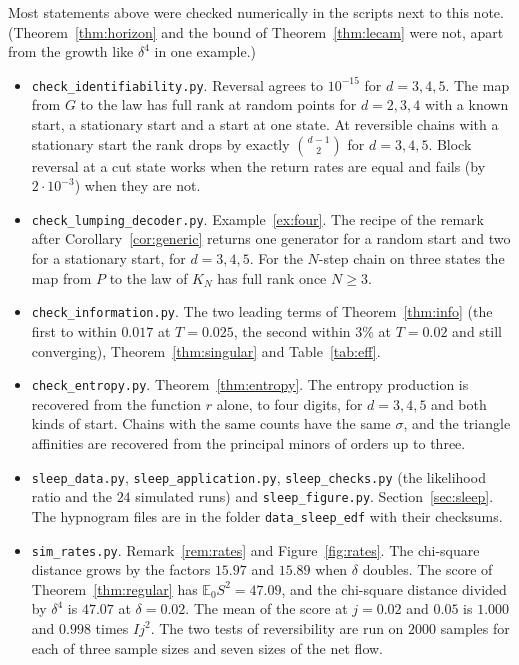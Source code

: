 \documentclass[11pt]{article}
\theoremstyle{definition}
\theoremstyle{remark}
\newcommand{\E}{\mathbb E}
\begin{document}
Most statements above were checked numerically in the scripts next to this note. (Theorem~\ref{thm:horizon} and the bound of Theorem~\ref{thm:lecam} were not, apart from the growth like $\delta^4$ in one example.)
\begin{itemize}[itemsep=1pt]
\item \texttt{check\_identifiability.py}. Reversal agrees to $10^{-15}$ for
 $d=3,4,5$. The map from $G$ to the law has full rank at random points for
 $d=2,3,4$ with a known start, a stationary start and a start at one state. At
 reversible chains with a stationary start the rank drops by exactly
 $\binom{d-1}2$ for $d=3,4,5$. Block reversal at a cut state works when the
 return rates are equal and fails (by $2\cdot10^{-3}$) when they are not.
\item \texttt{check\_lumping\_decoder.py}. Example~\ref{ex:four}. The recipe of
 the remark after Corollary~\ref{cor:generic} returns one generator for a random
 start and two for a stationary start, for $d=3,4,5$. For the $N$-step chain on
 three states the map from $P$ to the law of $K_N$ has full rank once $N\ge3$.
\item \texttt{check\_information.py}. The two leading terms of
 Theorem~\ref{thm:info} (the first to within $0.017$ at $T=0.025$, the second
 within $3\%$ at $T=0.02$ and still converging), Theorem~\ref{thm:singular} and
 Table~\ref{tab:eff}.
\item \texttt{check\_entropy.py}. Theorem~\ref{thm:entropy}. The entropy
 production is recovered from the function $r$ alone, to four digits, for
 $d=3,4,5$ and both kinds of start. Chains with the same counts have the same
 $\sigma$, and the triangle affinities are recovered from the principal minors
 of orders up to three.
\item \texttt{sleep\_data.py}, \texttt{sleep\_application.py},
 \texttt{sleep\_checks.py} (the likelihood ratio and the $24$ simulated runs) and
 \texttt{sleep\_figure.py}. Section~\ref{sec:sleep}. The hypnogram files are in
 the folder \texttt{data\_sleep\_edf} with their checksums.
\item \texttt{sim\_rates.py}. Remark~\ref{rem:rates} and Figure~\ref{fig:rates}.
 The chi-square distance grows by the factors $15.97$ and $15.89$ when
 $\delta$ doubles. The score of Theorem~\ref{thm:regular} has $\E_0S^2=47.09$,
 and the chi-square distance divided by $\delta^4$ is $47.07$ at
 $\delta=0.02$. The mean of the score at $j=0.02$ and $0.05$ is $1.000$ and
 $0.998$ times $Ij^2$. The two tests of reversibility are run on $2000$
 samples for each of three sample sizes and seven sizes of the net flow.

\end{itemize}
\end{document}
